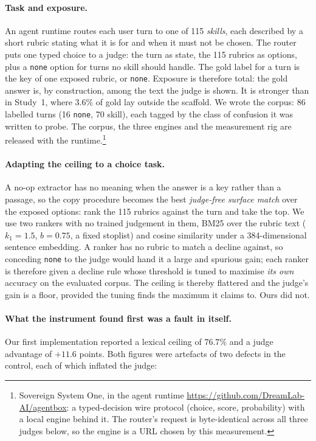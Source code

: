\documentclass[10pt,twocolumn]{article}
\begin{document}
\paragraph{Task and exposure.} An agent runtime routes each user turn to one of 115 \emph{skills}, each described by a short rubric stating what it is for and when it must not be chosen. The router puts one typed choice to a judge: the turn as state, the 115 rubrics as options, plus a \texttt{none} option for turns no skill should handle. The gold label for a turn is the key of one exposed rubric, or \texttt{none}. Exposure is therefore total: the gold answer is, by construction, among the text the judge is shown. It is stronger than in Study~1, where $3.6\%$ of gold lay outside the scaffold. We wrote the corpus: 86 labelled turns (16 \texttt{none}, 70 skill), each tagged by the class of confusion it was written to probe. The corpus, the three engines and the measurement rig are released with the runtime.\footnote{Sovereign System One, in the agent runtime \url{https://github.com/DreamLab-AI/agentbox}: a typed-decision wire protocol (choice, score, probability) with a local engine behind it. The router's request is byte-identical across all three judges below, so the engine is a URL chosen by this measurement.}

\paragraph{Adapting the ceiling to a choice task.} A no-op extractor has no meaning when the answer is a key rather than a passage, so the copy procedure becomes the best \emph{judge-free surface match} over the exposed options: rank the 115 rubrics against the turn and take the top. We use two rankers with no trained judgement in them, BM25 over the rubric text ($k_1{=}1.5$, $b{=}0.75$, a fixed stoplist) and cosine similarity under a 384-dimensional sentence embedding. A ranker has no rubric to match a decline against, so conceding \texttt{none} to the judge would hand it a large and spurious gain; each ranker is therefore given a decline rule whose threshold is tuned to maximise \emph{its own} accuracy on the evaluated corpus. The ceiling is thereby flattered and the judge's gain is a floor, provided the tuning finds the maximum it claims to. Ours did not.

\paragraph{What the instrument found first was a fault in itself.}\label{par:selffault} Our first implementation reported a lexical ceiling of $76.7\%$ and a judge advantage of $+11.6$ points. Both figures were artefacts of two defects in the control, each of which inflated the judge:
\end{document}
